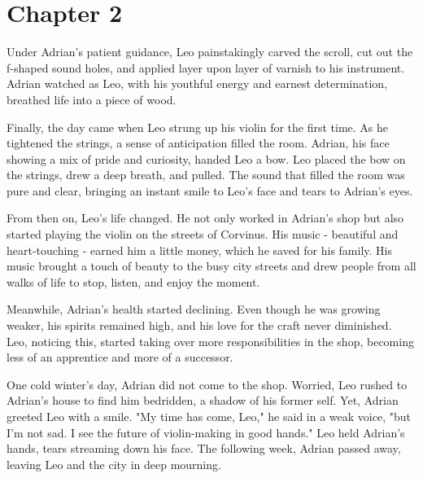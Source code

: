 \section{Chapter 2}
Under Adrian's patient guidance, Leo painstakingly carved the scroll, cut out the f-shaped sound holes, and applied layer upon layer of varnish to his instrument. Adrian watched as Leo, with his youthful energy and earnest determination, breathed life into a piece of wood.

Finally, the day came when Leo strung up his violin for the first time. As he tightened the strings, a sense of anticipation filled the room. Adrian, his face showing a mix of pride and curiosity, handed Leo a bow. Leo placed the bow on the strings, drew a deep breath, and pulled. The sound that filled the room was pure and clear, bringing an instant smile to Leo's face and tears to Adrian's eyes.

From then on, Leo's life changed. He not only worked in Adrian's shop but also started playing the violin on the streets of Corvinus. His music - beautiful and heart-touching - earned him a little money, which he saved for his family. His music brought a touch of beauty to the busy city streets and drew people from all walks of life to stop, listen, and enjoy the moment.

Meanwhile, Adrian's health started declining. Even though he was growing weaker, his spirits remained high, and his love for the craft never diminished. Leo, noticing this, started taking over more responsibilities in the shop, becoming less of an apprentice and more of a successor.

One cold winter's day, Adrian did not come to the shop. Worried, Leo rushed to Adrian's house to find him bedridden, a shadow of his former self. Yet, Adrian greeted Leo with a smile. "My time has come, Leo," he said in a weak voice, "but I'm not sad. I see the future of violin-making in good hands." Leo held Adrian's hands, tears streaming down his face. The following week, Adrian passed away, leaving Leo and the city in deep mourning.
